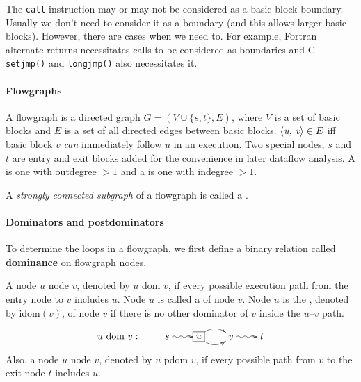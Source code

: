 \documentclass{memo}
\begin{document}
The {\tt call} instruction may or may not be considered as a basic block
boundary. Usually we don't need to consider it as a boundary (and this allows
larger basic blocks). However, there are cases when we need to. For example, 
Fortran alternate returns necessitates calls to be considered as
   boundaries and  C \verb+setjmp()+ and \verb+longjmp()+ also necessitates it.



\paragraph{Flowgraphs} A flowgraph is a directed graph $G = (V \cup
\{s, t\}, E)$, where $V$ is a set of basic blocks and $E$ is a set of all
directed edges between basic blocks. $\mbox{$\langle{\textit{u, v}}\rangle$} \in E$ iff basic block $v$
{\em can\/} immediately follow $u$ in an execution. 
Two special nodes, $s$ and $t$ are entry
and exit blocks added for the convenience in later dataflow analysis.
A  is one with outdegree $>1$ and a  is one
with indegree $> 1$. 

A {\em strongly connected subgraph\/} of a flowgraph is called a . 


\paragraph{Dominators and postdominators}
To determine the loops in a flowgraph, we first define a binary relation
called {\bf dominance\/} on flowgraph nodes.

A node $u$  node $v$, denoted by $u \mbox{\ dom\ } v$, if every
possible execution path from the entry node to $v$ includes $u$. 
Node $u$ is called a  of node $v$. 
Node $u$ is the , denoted by idom$(v)$, of node
$v$ if there is no other dominator of $v$ inside the $u$--$v$ path. 

\[\xymatrix@-0.2pc{
  \mbox{$u$ dom $v$}: &  s \ar@{~>}[r] & *+[F]{u} \ar@/^2ex/[r] \ar@/_2ex/[r] & v
  \ar@{~>}[r] & t
}
\]

Also, a node $u$  node $v$, denoted by $u \mbox{\ pdom\ }
v$, if every possible path from $v$ to the exit node $t$ includes $u$. 
\end{document}
